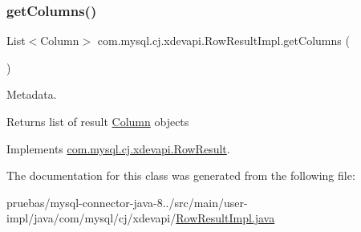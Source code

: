 \subsubsection{\texorpdfstring{get\+Columns()}{getColumns()}}
{\footnotesize\ttfamily List$<$Column$>$ com.\+mysql.\+cj.\+xdevapi.\+Row\+Result\+Impl.\+get\+Columns (\begin{DoxyParamCaption}{ }\end{DoxyParamCaption})}

Metadata.

\begin{DoxyReturn}{Returns}
list of result \mbox{\hyperlink{interfacecom_1_1mysql_1_1cj_1_1xdevapi_1_1_column}{Column}} objects 
\end{DoxyReturn}


Implements \mbox{\hyperlink{interfacecom_1_1mysql_1_1cj_1_1xdevapi_1_1_row_result_a4bd495dadd5549516c0f32366f8d77c7}{com.\+mysql.\+cj.\+xdevapi.\+Row\+Result}}.



The documentation for this class was generated from the following file\+:\begin{DoxyCompactItemize}
\item 
pruebas/mysql-\/connector-\/java-\/8../src/main/user-\/impl/java/com/mysql/cj/xdevapi/\mbox{\hyperlink{_row_result_impl_8java}{Row\+Result\+Impl.\+java}}\end{DoxyCompactItemize}
